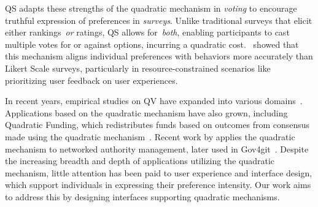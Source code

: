 QS adapts these strengths of the quadratic mechanism in \textit{voting} to encourage truthful expression of preferences in \textit{surveys}. Unlike traditional surveys that elicit either rankings~\textit{or} ratings, QS allows for~\textit{both}, enabling participants to cast multiple votes for or against options, incurring a quadratic cost.~\textcite{chengCanShowWhat2021} showed that this mechanism aligns individual preferences with behaviors more accurately than Likert Scale surveys, particularly in resource-constrained scenarios like prioritizing user feedback on user experiences.

In recent years, empirical studies on QV have expanded into various domains~\cite{naylor2017first, cavailleWhoCaresMeasuring}. Applications based on the quadratic mechanism have also grown, including Quadratic Funding, which redistributes funds based on outcomes from consensus made using the quadratic mechanism~\cite{buterinFlexibleDesignFunding2019a, freitasQuadraticFundingIncomplete2024}. Recent work by \textcite{southPluralManagement2024} applies the quadratic mechanism to networked authority management, later used in Gov4git~\cite{Gov4gitDecentralizedPlatform2023}. Despite the increasing breadth and depth of applications utilizing the quadratic mechanism, little attention has been paid to user experience and interface design, which support individuals in expressing their preference intensity. Our work aims to address this by designing interfaces supporting quadratic mechanisms.

